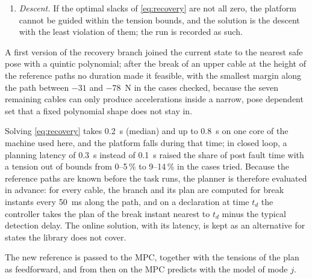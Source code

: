 \documentclass[10pt]{article}
\begin{document}
\begin{enumerate}
\begin{equation}
\begin{aligned}
\end{aligned}
\end{equation}
with $h=T/15$. The terminal conditions say that the platform ends at rest at a pose of $\mathcal F^{\,s_{\min}}_{\mathcal S_j}$, and the first term picks among those poses one close to the pose at the break; the nearest precomputed pose of $\mathcal F^{\,s_{\min}}_{\mathcal S_j}$ only seeds the solver. The twist and acceleration terms keep the motion direct and smooth, and the soft margin $s_r=20$~N keeps part of the tension range free for the feedback of the MPC. The hard margin $s_p=5$~N is relaxed by the slacks $s_k$, which keep the problem feasible from any state.
\item \emph{Descent.} If the optimal slacks of \eqref{eq:recovery} are not all zero, the platform cannot be guided within the tension bounds, and the solution is the descent with the least violation of them; the run is recorded as such.
\end{enumerate}
A first version of the recovery branch joined the current state to the nearest safe pose with a quintic polynomial; after the break of an upper cable at the height of the reference paths no duration made it feasible, with the smallest margin along the path between $-31$ and $-78$~N in the cases checked, because the seven remaining cables can only produce accelerations inside a narrow, pose dependent set that a fixed polynomial shape does not stay in.

Solving \eqref{eq:recovery} takes 0.2~s (median) and up to 0.8~s on one core of the machine used here, and the platform falls during that time; in closed loop, a planning latency of 0.3~s instead of 0.1~s raised the share of post fault time with a tension out of bounds from 0--5\,\% to 9--14\,\% in the cases tried. Because the reference paths are known before the task runs, the planner is therefore evaluated in advance: for every cable, the branch and its plan are computed for break instants every 50~ms along the path, and on a declaration at time $t_d$ the controller takes the plan of the break instant nearest to $t_d$ minus the typical detection delay. The online solution, with its latency, is kept as an alternative for states the library does not cover.

The new reference is passed to the MPC, together with the tensions of the plan as feedforward, and from then on the MPC predicts with the model of mode $j$.

\appendix
\end{document}
